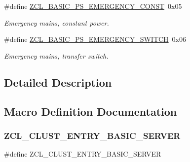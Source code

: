\begin{DoxyCompactItemize}
\mbox{\label{group__zcl__basic_gacdadf5dfcbe4d7435e1f718c9ce9d275}} 
\#define \hyperlink{group__zcl__basic_gacdadf5dfcbe4d7435e1f718c9ce9d275}{Z\+C\+L\+\_\+\+B\+A\+S\+I\+C\+\_\+\+P\+S\+\_\+\+E\+M\+E\+R\+G\+E\+N\+C\+Y\+\_\+\+C\+O\+N\+ST}~0x05
\begin{DoxyCompactList}\small\item\em Emergency mains, constant power. \end{DoxyCompactList}\item 
\mbox{\label{group__zcl__basic_ga6a1e540c72d5ec1df8acc904c83f4bc9}} 
\#define \hyperlink{group__zcl__basic_ga6a1e540c72d5ec1df8acc904c83f4bc9}{Z\+C\+L\+\_\+\+B\+A\+S\+I\+C\+\_\+\+P\+S\+\_\+\+E\+M\+E\+R\+G\+E\+N\+C\+Y\+\_\+\+S\+W\+I\+T\+CH}~0x06
\begin{DoxyCompactList}\small\item\em Emergency mains, transfer switch. \end{DoxyCompactList}\end{DoxyCompactItemize}


\subsection{Detailed Description}


\subsection{Macro Definition Documentation}
\mbox{\label{group__zcl__basic_gad8336fcfc2729c8deb86eda7f125f271}} 
\subsubsection{\texorpdfstring{Z\+C\+L\+\_\+\+C\+L\+U\+S\+T\+\_\+\+E\+N\+T\+R\+Y\+\_\+\+B\+A\+S\+I\+C\+\_\+\+S\+E\+R\+V\+ER}{ZCL\_CLUST\_ENTRY\_BASIC\_SERVER}}
{\footnotesize\ttfamily \#define Z\+C\+L\+\_\+\+C\+L\+U\+S\+T\+\_\+\+E\+N\+T\+R\+Y\+\_\+\+B\+A\+S\+I\+C\+\_\+\+S\+E\+R\+V\+ER}

